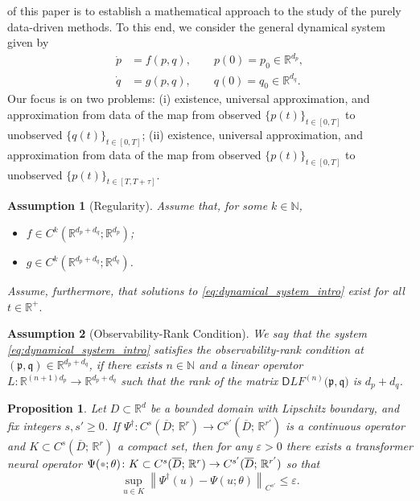 \documentclass[10pt,a4paper]{amsart}
\newtheorem{assumption}{Assumption}
\newtheorem{proposition}{Proposition}
\newcommand{\N}{\mathbbm{N}}
\newcommand{\R}{\mathbbm{R}}
\newcommand{\fp}{\mathfrak{p}}
\newcommand{\fq}{\mathfrak{q}}
\providecommand{\mathbbm}{\mathbb} %
\newcommand{\placeholder}{\mathord{\color{black!33}\bullet}}
\newcommand{\sD}{\mathsf{D}}
\begin{document}
of this paper is to establish a mathematical approach to the study
of the purely data-driven methods. To this end, we consider the general dynamical system given by
\begin{subequations}
\label{eq:dynamical_system_intro}
\begin{align}
        \label{eq:dynsys_f}
        \dot{p} &= f(p, q), \qquad p(0) = p_0 \in \R^{d_p}, \\
        \label{eq:dynsys_g}
        \dot{q} &= g(p, q), \qquad q(0) = q_0 \in \R^{d_q}.
\end{align}
\end{subequations}
Our focus is on two problems: (i) existence, universal approximation, and approximation from data
of the map from observed $\{p(t)\}_{t\in [0,T]}$ to unobserved $\{q(t)\}_{t\in [0,T]}$; (ii)
existence, universal approximation, and approximation from data of the map from  observed $\{p(t)\}_{t\in [0,T]}$ to unobserved $\{p(t)\}_{t\in [T,T+\tau]}$.

\begin{assumption}[Regularity]
\label{assump:regularity}
 Assume that, for some $k \in \N$,
 \begin{itemize}
     \item $f \in C^k (\R^{d_p + d_q}; \R^{d_p})$;
     \item $g \in C^k (\R^{d_p + d_q}; \R^{d_q})$.
 \end{itemize}
Assume, furthermore, that solutions to \eqref{eq:dynamical_system_intro} exist for all $t \in \R^+.$
\end{assumption}

\begin{assumption}[Observability-Rank Condition]
\label{assump:observability}
    We say that the system \eqref{eq:dynamical_system_intro} satisfies the observability-rank condition at $(\mathfrak{p}, \mathfrak{q})\in \R^{d_p + d_q}$, if there exists $n\in\N$ and a linear operator $L\colon\R^{(n+1)d_p}\to\R^{d_p+d_q}$ such that the rank of the matrix $\sD LF^{(n)}\bigl(\fp, \fq \bigr)$ is $d_p + d_q$.
\end{assumption}

\begin{proposition}
\label{thm:UANeuralOperator}
Let $D \subset \R^d$ be a bounded domain with Lipschitz boundary, and fix integers $s,s'\geq 0$. If $
\Psi^\dagger\colon C^{s}(\overline{D};\,\R^{r}) \to C^{s'}(\overline{D};\,\R^{r'})$
is a continuous operator and $K \subset C^{s}(\overline{D};\,\R^{r})$ a compact set, then for any $\varepsilon>0$ there exists a transformer neural operator 
$\Psi(\placeholder; \theta)\colon K \subset C^{s}(\overline{D};\,\R^{r}) \to C^{s'}(\overline{D};\,\R^{r'})$
so that
\begin{equation}
\sup_{u\in K} \left\| \Psi^\dagger(u) - \Psi(u;\theta) \right\|_{C^{s'}} \le \varepsilon .
\end{equation}
\end{proposition}
\end{document}

